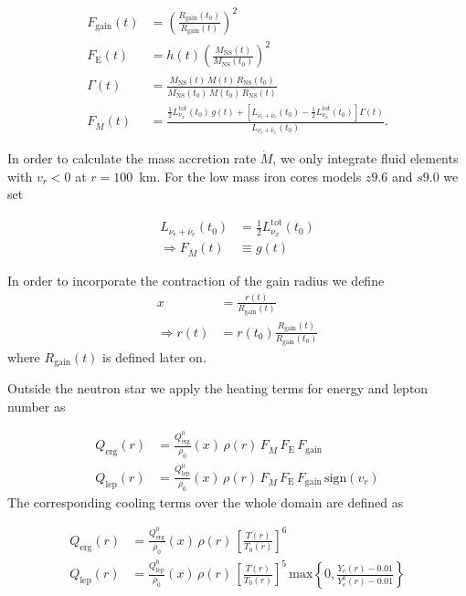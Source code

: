 \documentclass[fleqn,usenatbib]{mnras}
\begin{document}
\begin{align}
    F_\mathrm{gain}(t) &=
    \left(\frac{R_\mathrm{gain}(t_0)}{R_\mathrm{gain}(t)}\right)^2 \\
    F_\mathrm{E}(t) &= h(t)
    \left(\frac{M_\mathrm{NS}(t)}{M_\mathrm{NS}(t_0)}\right)^2 \\
    \Gamma(t) &= \frac{M_\mathrm{NS}(t) \,\dot{M}(t)
    \,R_\mathrm{NS}(t_0)}{M_\mathrm{NS}(t_0) \,\dot{M}(t_0) \,R_\mathrm{NS}(t)} \\
    F_{\dot{M}}(t) &= \frac{\frac{1}{2} L_{\nu_x}^\mathrm{tot}(t_0) \,g(t) + \left[
    L_{\nu_e+\bar{\nu}_e}(t_0) - \frac{1}{2} L_{\nu_x}^\mathrm{tot}(t_0)
    \right] \Gamma(t)}{L_{\nu_e+\bar{\nu}_e}(t_0)}.
\end{align}

In order to calculate the mass accretion rate $\dot{M}$, we only integrate fluid elements with $v_r < 0$ at $r = 100$~km.
For the low mass iron cores models $z9.6$ and $s9.0$ we set

\begin{align}
    L_{\nu_e+\bar{\nu}_e}(t_0) &= \frac{1}{2} L_{\nu_x}^\mathrm{tot}(t_0) \\
    \Rightarrow F_{\dot{M}}(t) &\equiv g(t)
\end{align}

In order to incorporate the contraction of the gain radius we define
\begin{align}
    x &= \frac{r(t)}{R_\mathrm{gain}(t)} \\
    \Rightarrow r(t) &= r(t_0) \frac{R_\mathrm{gain}(t)}{R_\mathrm{gain}(t_0)}
\end{align}
where $R_{\mathrm{gain}}(t)$ is defined later on.



Outside the neutron star we apply the heating terms for energy and lepton number as

\begin{align}
    Q_\mathrm{erg}(r) &= \frac{Q_\mathrm{erg}^0}{\rho_0}(x) \,\rho (r)
    \,F_{\dot{M}} \,F_\mathrm{E} \,F_\mathrm{gain} \\
    Q_\mathrm{lep}(r) &= \frac{Q_\mathrm{lep}^0}{\rho_0}(x) \,\rho (r)
    \,F_{\dot{M}} \,F_\mathrm{E} \,F_\mathrm{gain} \,\mathrm{sign}(v_r)
\end{align}
The corresponding cooling terms over the whole domain are defined as 

\begin{align}
    Q_\mathrm{erg}(r) &= \frac{Q_\mathrm{erg}^0}{\rho_0}(x) \,\rho (r)
    \,\left[\frac{T(r)}{T_0(r)}\right]^6 \\
    Q_\mathrm{lep}(r) &= \frac{Q_\mathrm{lep}^0}{\rho_0}(x) \,\rho (r)
    \,\left[\frac{T(r)}{T_0(r)}\right]^5 \, \mathrm{max}\left\{0, \frac{Y_e(r) -
    0.01}{Y_e^0(r) - 0.01}\right\} %
\end{align}
\end{document}
